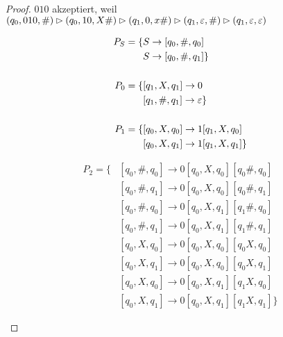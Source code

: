 \begin{proof}
    
    $010$ akzeptiert, weil
        $(q_0, 010, \#)\rhd (q_0, 10, X\#)\rhd (q_1, 0, x\#)\rhd (q_1, \varepsilon, \#)\rhd (q_1, \varepsilon, \varepsilon)$
    
    \begin{center}
    \begin{minipage}{50mm}
    \begin{align*}
    P_S = \{ 
    & S \to [q_0, \#, q_0]\\
    & S \to [q_0, \#, q_1] 
    \}\\
    \\
    P_0 = \{ 
    & [q_1, X, q_1] \to 0\\
    & [q_1, \#, q_1] \to \varepsilon
    \}\\
    \\
    P_1 = \{ 
    & [q_0, X, q_0] \to 1[q_1, X, q_0]\\
    & [q_0, X, q_1] \to 1[q_1, X, q_1]
    \}\\
    \end{align*}
    \end{minipage}
    \begin{minipage}{50mm}
    \begin{align*}
    P_2 = \{ 
    & [q_0, \#,q_0] \to 0[q_0, X, q_0] [q_0 \#, q_0]\\
    & [q_0, \#,q_1] \to 0[q_0, X, q_0] [q_0 \#, q_1]\\
    & [q_0, \#,q_0] \to 0[q_0, X, q_1] [q_1 \#, q_0]\\
    & [q_0, \#,q_1] \to 0[q_0, X, q_1] [q_1 \#, q_1]\\
    & [q_0, X,q_0] \to 0[q_0, X, q_0] [q_0 X, q_0]\\
    & [q_0, X,q_1] \to 0[q_0, X, q_0] [q_0 X, q_1]\\
    & [q_0, X,q_0] \to 0[q_0, X, q_1] [q_1 X, q_0]\\
    & [q_0, X,q_1] \to 0[q_0, X, q_1] [q_1 X, q_1]
    \}
    \end{align*}
    \end{minipage}
    \end{center}
    

\end{proof}
